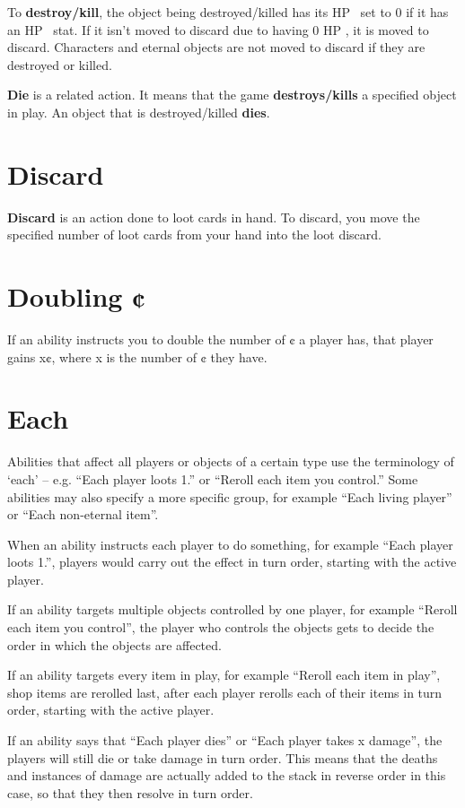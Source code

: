 \documentclass[
  fontsize=10pt,
  paper=a5,
  version=last,
  chapterprefix=true,
  bindingoffset=5mm,
  ]{scrbook}
\newcommand*{\inlineicon}[1]{%
    \raisebox{-.3\baselineskip}{%
        \smash{%
            \texttt{[image: \#1]}%
        }%
    }%
}
\newcommand{\heart}{\inlineicon{./assets/ms-heart.png}}
\begin{document}
    To \textbf{destroy/kill}, the object being destroyed/killed has its HP\heart\ set to 0 if it has an HP\heart\ stat. If it isn’t moved to discard due to having 0 HP\heart, it is moved to discard. Characters and eternal objects are not moved to discard if they are destroyed or killed.

    \textbf{Die} is a related action. It means that the game \textbf{destroys/kills} a specified object in play. An object that is destroyed/killed \textbf{dies}.
    \section{Discard}
    \textbf{Discard} is an action done to loot cards in hand. To discard, you move the specified number of loot cards from your hand into the loot discard.
    \section{Doubling ¢}
    If an ability instructs you to double the number of ¢ a player has, that player gains x¢, where x is the number of ¢ they have.
    \section{Each}
    Abilities that affect all players or objects of a certain type use the terminology of ‘each’ – e.g. “Each player loots 1.” or “Reroll each item you control.” Some abilities may also specify a more specific group, for example “Each living player” or “Each non-eternal item”.

    When an ability instructs each player to do something, for example “Each player loots 1.”, players would carry out the effect in turn order, starting with the active player.

    If an ability targets multiple objects controlled by one player, for example “Reroll each item you control”, the player who controls the objects gets to decide the order in which the objects are affected.

    If an ability targets every item in play, for example “Reroll each item in play”, shop items are rerolled last, after each player rerolls each of their items in turn order, starting with the active player.

    If an ability says that “Each player dies” or “Each player takes x damage”, the players will still die or take damage in turn order. This means that the deaths and instances of damage are actually added to the stack in reverse order in this case, so that they then resolve in turn order.
\end{document}
